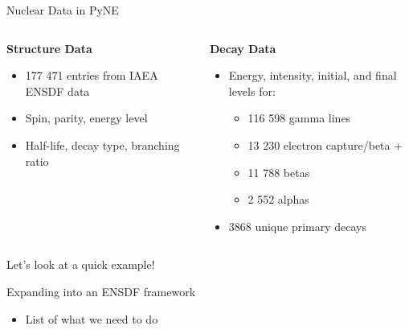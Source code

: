 \documentclass[xcolor=x11names,compress]{beamer}
\renewcommand{\(}{\begin{columns}}
\renewcommand{\)}{\end{columns}}
\newcommand{\<}[1]{\begin{column}{#1}}
\renewcommand{\>}{\end{column}}
\begin{document}
\begin{frame}{Nuclear Data in PyNE}

	\begin{columns}[T]
  	\begin{column}{0.5\textwidth}
  	    \begin{center}
  	    \textbf{Structure Data}
  	    \end{center}
        \begin{itemize}
          \item 177 471 entries from IAEA ENSDF data
          \item Spin, parity, energy level
          \item Half-life, decay type, branching ratio
        \end{itemize}
  	\end{column}
 	\begin{column}{0.5\textwidth}
        \begin{center}
  	    \textbf{Decay Data}
  	    \end{center}
        \begin{itemize}
          \item Energy, intensity, initial, and final levels for:
          \begin{itemize}
            \item 116 598 gamma lines
            \item 13 230 electron capture/beta +
            \item 11 788 betas
            \item 2 552 alphas
          \end{itemize}
          \item 3868 unique primary decays
        \end{itemize}
  	\end{column}
	\end{columns}

    \vspace*{1 em}
    Let's look at a \alert{quick example}!

\end{frame}

\begin{frame}{Expanding into an ENSDF framework}

    \begin{itemize}
        \item List of what we need to do
    \end{itemize}
    
\end{frame}
\end{document}
